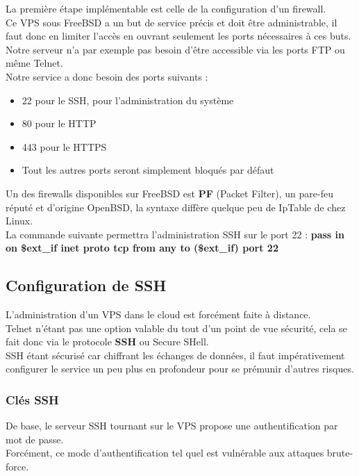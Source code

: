 \documentclass[a4paper,10pt,final,fleqn]{article}
\begin{document}
				La première étape implémentable est celle de la configuration d'un firewall.\\
				Ce VPS sous FreeBSD a un but de service précis et doit être administrable, il faut donc en limiter l'accès en ouvrant seulement les ports nécessaires à ces buts. Notre serveur n'a par exemple pas besoin d'être accessible via les ports FTP ou même Telnet.\\

				Notre service a donc besoin des ports suivants : \\
				\begin{itemize}
					\item 22 pour le SSH, pour l'administration du système
					\item 80 pour le HTTP
					\item 443 pour le HTTPS
					\item Tout les autres ports seront simplement bloqués par défaut
				\end{itemize}

				Un des firewalls disponibles sur FreeBSD est \textbf{PF} (Packet Filter), un pare-feu réputé et d'origine OpenBSD, la syntaxe diffère quelque peu de IpTable de chez Linux.\\

				La commande suivante permettra l'administration SSH sur le port 22 : \textbf{pass in on \$ext\_if inet proto tcp from any to (\$ext\_if) port 22}

			\subsection{Configuration de SSH}

				L'administration d'un VPS dans le cloud est forcément faite à distance.\\
				Telnet n'étant pas une option valable du tout d'un point de vue sécurité, cela se fait donc via le protocole \textbf{SSH} ou Secure SHell.\\

				SSH étant sécurisé car chiffrant les échanges de données, il faut impérativement configurer le service un peu plus en profondeur pour se prémunir d'autres risques.\\

				\subsubsection{Clés SSH}

					De base, le serveur SSH tournant sur le VPS propose une authentification par mot de passe.\\
					Forcément, ce mode d'authentification tel quel est vulnérable aux attaques brute-force.\\
\end{document}

